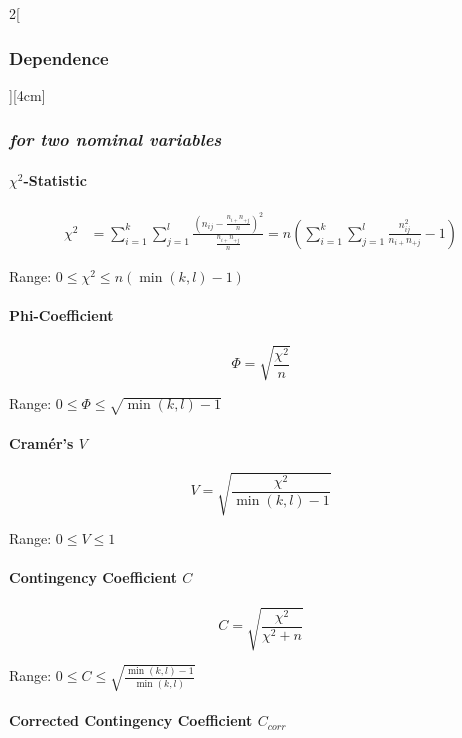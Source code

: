 \documentclass[8pt]{extarticle}
\begin{document}
\begin{multicols}{2}[\subsubsection{Dependence}][4cm]

\subsubsection*{\textit{for two nominal variables}}

\paragraph{$\chi^2$-Statistic}

\begin{equation*}
\begin{split}
\chi^2 & =\sum\limits_{i=1}^k \sum\limits_{j=1}^l \frac{(n_{ij}-\frac{n_{i+}n_{+j}}{n})^2}{\frac{n_{i+}n_{+j}}{n}}  =n\left(\sum\limits_{i=1}^k \sum\limits_{j=1}^l \frac{n_{ij}^2}{n_{i+}n_{+j}}-1\right)
\end{split}
\end{equation*}

Range: $ 0 \le \chi^2 \le n(\min(k,l)-1)$

\paragraph{Phi-Coefficient}

$$\Phi=\sqrt{\frac{\chi^2}{n}}$$

Range: $ 0 \le \Phi \le \sqrt{\min(k,l)-1}$

\paragraph{Cram\'er's $V$}

$$ V= \sqrt{\frac{\chi^2}{\min(k,l)-1}}$$

Range: $ 0 \le V \le 1$

\paragraph{Contingency Coefficient $C$}

$$C=\sqrt{\frac{\chi^2}{\chi^2 + n}}$$

Range: $ 0 \le C \le \sqrt{\frac{\min(k,l)-1}{\min(k,l)}} $

\paragraph{Corrected Contingency Coefficient $C_{corr}$}


\end{multicols}
\end{document}
